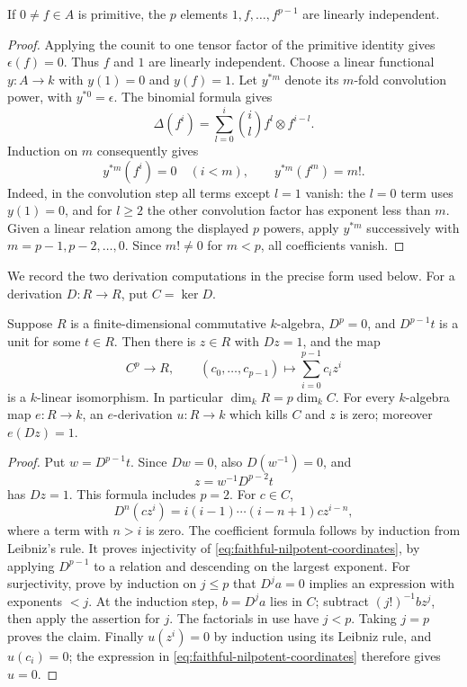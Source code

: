 \begin{srlemma}\label{lem:faithful-primitive-powers}
If \(0\ne f\in A\) is primitive, the \(p\) elements
\(1,f,\ldots,f^{p-1}\) are linearly independent.
\end{srlemma}
\begin{proof}
Applying the counit to one tensor factor of the primitive identity
gives \(\epsilon(f)=0\).  Thus \(f\) and \(1\) are linearly independent.
Choose a linear functional \(y:A\to k\) with \(y(1)=0\) and \(y(f)=1\).
Let \(y^{*m}\) denote its \(m\)-fold convolution power, with
\(y^{*0}=\epsilon\).  The binomial formula gives
\[
 \Delta(f^i)=\sum_{l=0}^i {i\choose l}f^l\otimes f^{i-l}.
\]
Induction on \(m\) consequently gives
\[
 y^{*m}(f^i)=0\quad(i<m),\qquad
 y^{*m}(f^m)=m!.
\]
Indeed, in the convolution step all terms except \(l=1\) vanish:
the \(l=0\) term uses \(y(1)=0\), and for \(l\ge2\) the other
convolution factor has exponent less than \(m\).
Given a linear relation among the displayed \(p\) powers, apply
\(y^{*m}\) successively with \(m=p-1,p-2,\ldots,0\).
Since \(m!\ne0\) for \(m<p\), all coefficients vanish.
\end{proof}

We record the two derivation computations in the precise form used
below.  For a derivation \(D:R\to R\), put \(C=\ker D\).

\begin{srlemma}
\label{lem:faithful-nilpotent-derivation}
Suppose \(R\) is a finite-dimensional commutative \(k\)-algebra,
\(D^p=0\), and \(D^{p-1}t\) is a unit for some \(t\in R\).
Then there is \(z\in R\) with \(Dz=1\), and the map
\[
 C^p\longrightarrow R,\qquad (c_0,\ldots,c_{p-1})
       \longmapsto\sum_{i=0}^{p-1}c_i z^i
 \tag{HC1}\label{eq:faithful-nilpotent-coordinates}
\]
is a \(k\)-linear isomorphism.  In particular
\(\dim_kR=p\dim_k C\).
For every \(k\)-algebra map \(e:R\to k\), an \(e\)-derivation
\(u:R\to k\) which kills \(C\) and \(z\) is zero; moreover \(e(Dz)=1\).
\end{srlemma}
\begin{proof}
Put \(w=D^{p-1}t\).  Since \(Dw=0\), also \(D(w^{-1})=0\), and
\[
 z=w^{-1}D^{p-2}t
\]
has \(Dz=1\).  This formula includes \(p=2\).
For \(c\in C\),
\[
 D^n(cz^i)=i(i-1)\cdots(i-n+1)c z^{i-n},
\]
where a term with \(n>i\) is zero.  The coefficient formula follows
by induction from Leibniz's rule.  It proves injectivity of
\eqref{eq:faithful-nilpotent-coordinates}, by applying \(D^{p-1}\)
to a relation and descending on the largest exponent.
For surjectivity, prove by induction on \(j\le p\) that
\(D^ja=0\) implies an expression with exponents \(<j\).
At the induction step, \(b=D^ja\) lies in \(C\); subtract
\((j!)^{-1}bz^j\), then apply the assertion for \(j\).
The factorials in use have \(j<p\).  Taking \(j=p\) proves the claim.
Finally \(u(z^i)=0\) by induction using its Leibniz rule, and
\(u(c_i)=0\); the expression in \eqref{eq:faithful-nilpotent-coordinates}
therefore gives \(u=0\).
\end{proof}


